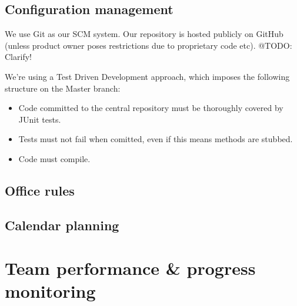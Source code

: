 \documentclass[a4paper,11pt]{article}
\begin{document}
\subsection{Configuration management} %
\label{subsec:configuration_management}

We use Git as our SCM system. Our repository is hosted publicly on GitHub (unless product owner poses restrictions due to proprietary code etc). @TODO: Clarify!

We're using a Test Driven Development approach, which imposes the following structure on the Master branch:
\begin{itemize}
\item Code committed to the central repository must be thoroughly covered by JUnit tests.
\item Tests must not fail when comitted, even if this means methods are stubbed.
\item Code must compile.
\end{itemize}


\subsection{Office rules} %
\label{subsec:office_rules}


\subsection{Calendar planning} %
\label{subsec:calendar_planning}



\section{Team performance \& progress monitoring} %
\label{sec:team_performance_progress_monitoring}

\end{document}
